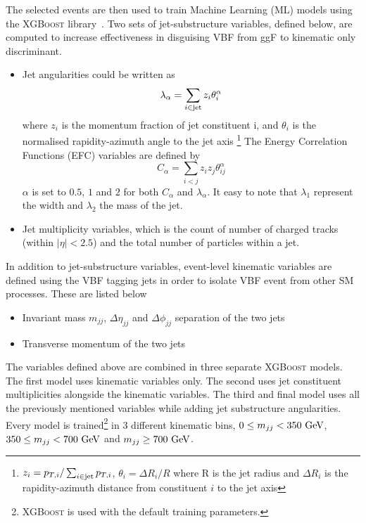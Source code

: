 \documentclass[11pt]{cernrep}
\begin{document}
The selected events are then used to train Machine Learning (ML) models using the \textsc{XGBoost} library~\cite{Chen:2016btl}. Two sets of jet-substructure variables, defined below, are computed to increase effectiveness in disguising VBF from ggF to kinematic only discriminant.
\begin{itemize}
    \item Jet angularities \cite{Larkoski:2014pca} could be written as
    \begin{equation}
        \lambda_{\alpha} = \sum_{i \in \rm jet} z_i \theta_{i}^\alpha
    \end{equation}
    where $z_i$ is the momentum fraction of jet constituent i, and $\theta_i$ is the normalised rapidity-azimuth angle to the jet axis \footnote{$z_i = p_{T,i}/\sum_{i\in \rm jet} p_{T,i}$, $\theta_i = \Delta R_i/R$ where R is the jet radius and $\Delta R_i$ is the rapidity-azimuth distance from constituent $i$ to the jet axis}
    The Energy Correlation Functions (EFC) \cite{Moult:2016cvt} variables are defined by
    \begin{equation}
        C_{\alpha} = \sum_{i < j} z_i z_j \theta_{ij}^\alpha
    \end{equation}
    $\alpha$ is set to $0.5$, $1$ and $2$ for both $C_{\alpha}$ and $\lambda_{\alpha}$. It easy to note that $\lambda_1$ represent the width and $\lambda_2$ the mass of the jet.
    \item Jet multiplicity variables, which is the count of number of charged  tracks (within $|\eta|<2.5$) and the total number of particles within a jet.
\end{itemize}

In addition to jet-substructure variables, event-level kinematic variables are defined using the VBF tagging jets in order to isolate VBF event from other SM processes. These are listed below
\begin{itemize}
    \item Invariant mass $m_{jj}$, $\Delta\eta_{jj}$ and $\Delta\phi_{jj}$ separation of the two jets
    \item Transverse momentum of the two jets
\end{itemize}

The variables defined above are combined in three separate \textsc{XGBoost} models. The first model uses kinematic variables only. The second uses jet constituent multiplicities alongside the kinematic variables. The third and final model uses all the previously mentioned variables while adding jet substructure angularities. Every model is trained\footnote{\textsc{XGBoost} is used with the default training parameters.} in 3 different kinematic bins, $0\leq m_{jj}<350~\rm GeV$, $350\leq m_{jj} <700~\rm GeV$ and $m_{jj}\geq 700~\rm GeV$.
\end{document}
